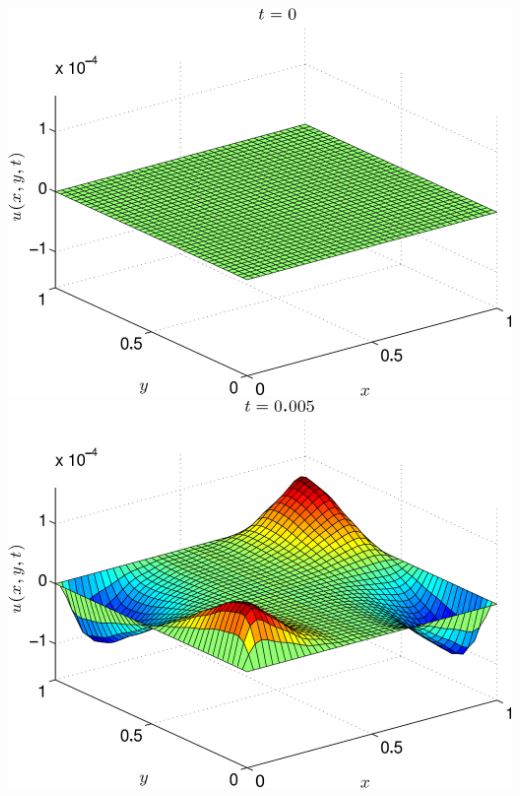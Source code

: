 {\begin{solution}
\begin{enumerate}
\includegraphics[scale=0.4]{heat2d1}
\includegraphics[scale=0.4]{heat2d2}


\end{enumerate}
\end{solution}}
